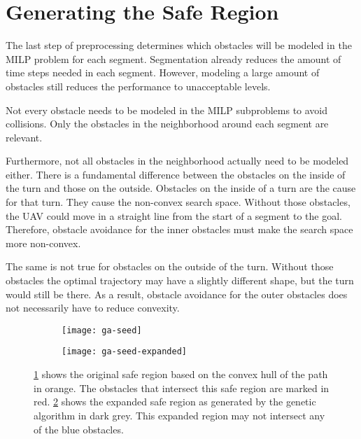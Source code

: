 \clearpage

\section{Generating the Safe Region}
The last step of preprocessing determines which obstacles will be modeled in the MILP problem for each segment. Segmentation already reduces the amount of time steps needed in each segment. However, modeling a large amount of obstacles still reduces the performance to unacceptable levels. 
\par
Not every obstacle needs to be modeled in the MILP subproblems to avoid collisions. Only the obstacles in the neighborhood around each segment are relevant. 
\par
Furthermore, not all obstacles in the neighborhood actually need to be modeled either. There is a fundamental difference between the obstacles on the inside of the turn and those on the outside. Obstacles on the inside of a turn are the cause for that turn. They cause the non-convex search space. Without those obstacles, the UAV could move in a straight line from the start of a segment to the goal. Therefore, obstacle avoidance for the inner obstacles must make the search space more non-convex.
\par
The same is not true for obstacles on the outside of the turn. Without those obstacles the optimal trajectory may have a slightly different shape, but the turn would still be there. As a result, obstacle avoidance for the outer obstacles does not necessarily have to reduce convexity. \\

\begin{figure}[h]
	\centering
	\begin{subfigure}[t]{0.45\columnwidth}
        		\texttt{[image: ga-seed]}
        		\caption{}
        		 \label{fig:ga-seed}
	\end{subfigure}	
	\hfill
	\begin{subfigure}[t]{0.45\columnwidth}
        		\texttt{[image: ga-seed-expanded]}
        		\caption{}
        		 \label{fig:ga-seed-expanded}
	\end{subfigure}		
	\caption[A demonstration of the input and output of the genetic algorithm]{\ref{fig:ga-seed} shows the original safe region based on the convex hull of the path in orange. The obstacles that intersect this safe region are marked in red. \ref{fig:ga-seed-expanded} shows the expanded safe region as generated by the genetic algorithm in dark grey. This expanded region may not intersect any of the blue obstacles.}
    \label{fig:ga-seed-demo}     
\end{figure}

